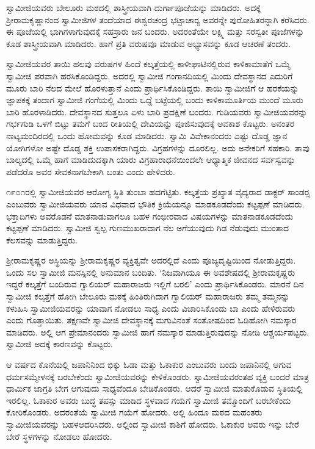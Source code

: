  ಸ್ವಾಮೀಜಿಯವರು ಬೇಲೂರು ಮಠದಲ್ಲಿ ಶಾಸ್ತ್ರೀಯವಾಗಿ ದುರ್ಗಾಪೂಜೆಯನ್ನು ಮಾಡಿದರು. ಅದಕ್ಕೆ ಶ‍್ರೀರಾಮಕೃಷ್ಣಾನಂದ ಸ್ವಾಮೀಜಿಗಳ ತಂದೆಯಾದ ಈಶ್ವರಚಂದ್ರ ಭಟ್ಟಾಚಾರ‍್ಯ ಅವರನ್ನೇ ಪುರೋಹಿತರನ್ನಾಗಿ ಕರೆಸಿದರು. ಈ ಪೂಜೆಯಲ್ಲಿ ಭಾಗಿಗಳಾಗುವುದಕ್ಕೆ ಸಹಸ್ರಾರು ಜನ ಬಂದರು. ಅದರಂತೆಯೇ ಲಕ್ಷ್ಮಿ ಮತ್ತು ಸರಸ್ವತೀ ಪೂಜೆಗಳನ್ನು ಕೂಡ ಶಾಸ್ತ್ರೀಯವಾಗಿ ಮಾಡಿದರು. ಹಾಗೆ ಪ್ರತಿ ವರುಷವೂ ಮಾಡುವ ಅಭ್ಯಾಸವನ್ನು ಕೂಡ ಆಚರಣೆ ತಂದರು. 

 ಸ್ವಾಮೀಜಿಯವರ ತಾಯಿ ಹಲವು ವರುಷಗಳ ಹಿಂದೆ ಕಲ್ಕತ್ತೆಯಲ್ಲಿ ಕಾಳೀಘಾಟಿನಲ್ಲಿರುವ ಕಾಳಿಕಾಮಾತೆಗೆ ಒಮ್ಮೆ ಸ್ವಾಮೀಜಿ ಪರವಾಗಿ ಹರಸಿಕೊಂಡಿದ್ದರು. ಅದರಲ್ಲಿ ಸ್ವಾಮೀಜಿ ಗಂಗಾನದಿಯಲ್ಲಿ ಮಿಂದು ದೇವಸ್ಥಾನದ ಎದುರಿಗೆ ಮೂರು ಬಾರಿ ನೆಲದ ಮೇಲೆ ಹೊರಳುತ್ತಾನೆ ಎಂದು ಪ್ರಾರ್ಥಿಸಿಕೊಂಡಿದ್ದರು. ತಾಯಿ ಸ್ವಾಮೀಜಿಗೆ ಆ ಹರಕೆಯನ್ನು ಜ್ಞಾಪಕಕ್ಕೆ ತಂದಾಗ ಸ್ವಾಮೀಜಿ ಗಂಗೆಯಲ್ಲಿ ಮಿಂದು ಒದ್ದೆ ಬಟ್ಟೆಯಲ್ಲಿ ಬಂದು ಕಾಳಿಕಾಮೂರ್ತಿಯ ಮುಂದೆ ಮೂರು ಬಾರಿ ಹೊರಳಾಡಿದರು. ದೇವಸ್ಥಾನದ ಸುತ್ತಲೂ ಏಳು ಬಾರಿ ಪ್ರದಕ್ಷಿಣೆ ಬಂದರು. ಗುಡಿಯವರು ಸ್ವಾಮೀಜಿಯವರನ್ನು ಗರ್ಭಗುಡಿ ಒಳಗೆ ಬಿಟ್ಟು ತಮಗೆ ಬಂದ ರೀತಿಯಲ್ಲಿ ದೇವಿಯನ್ನು ಪೂಜಿಸುವುದಕ್ಕೆ ಅವಕಾಶ ಕೊಟ್ಟರು. ಅನಂತರ ನಾಟ್ಯಮಂದಿರದಲ್ಲಿ ಒಂದು ಹೋಮವನ್ನು ಕೂಡ ಮಾಡಿದರು. ಸ್ವಾಮಿ ವಿವೇಕಾನಂದರು ಎಷ್ಟು ದೊಡ್ಡ ಜ್ಞಾನ ಯೋಗಿಗಳೋ ಅಷ್ಟೇ ದೊಡ್ಡ ಶಕ್ತಿ ಉಪಾಸಕರಾಗಿದ್ದರು. ವಿಗ್ರಹಗಳನ್ನು ದೂರಲಿಲ್ಲ. ಅದು ಅನೇಕರಿಗೆ ಸಹಕಾರಿ. ತಾವು ಬಾಲ್ಯದಲ್ಲಿ ಒಮ್ಮೆ ಹಾಗೆ ಮಾಡಿದುದಕ್ಕಾಗಿ ಯಾರು ವಿಗ್ರಹಾರಾಧನೆಯಿಂದಲೇ ಆಧ್ಯಾತ್ಮಿಕ ಜೀವನದ ಸರ್ವಸ್ವವನ್ನು ಪಡೆದರೊ ಅವರ ಸೇವಕನಾಗಬೇಕಾಗಿ ಬಂತು ಎಂದು ಹೇಳಿದರು. 

 ೧೯೦೧ರಲ್ಲಿ ಸ್ವಾಮೀಜಿಯವರ ಆರೋಗ್ಯ ಸ್ಥಿತಿ ತುಂಬಾ ಹದಗೆಟ್ಟಿತು. ಕಲ್ಕತ್ತೆಯ ಪ್ರಖ್ಯಾತ ವೈದ್ಯರಾದ ಡಾಕ್ಟರ್ ಸಾಂಡರ‍್ಸ ಎಂಬುವರು ಸ್ವಾಮೀಜಿಯವರು ಯಾವ ವಿಧವಾದ ಭೌತಿಕ ಕ್ರಿಯೆಯನ್ನೂ ಮಾಡಕೂಡದೆಂದು ಕಟ್ಟಪ್ಪಣೆ ಮಾಡಿದರು. ಭಕ್ತಾದಿಗಳು ಅವರೊಡನೆ ಮಾತನಾಡುವಾಗಲೂ ಬಹಳ ಗಂಭೀರವಾದ ವಿಷಯಗಳನ್ನು ಮಾತನಾಡಕೂಡದೆಂದು ಕಟ್ಟಪ್ಪಣೆ ಮಾಡಿದರು. ಸ್ವಾಮೀಜಿ ಸ್ವಲ್ಪ ಗುಣಮುಖರಾದಾಗ ನೆಲ ಅಗೆಯುವುದು ಗಿಡ ನೆಡುವುದು ಮುಂತಾದ ಕೆಲಸವನ್ನು ಮಾಡುತ್ತಿದ್ದರು. 

 ಶ‍್ರೀರಾಮಕೃಷ್ಣರ ಅಸ್ಥಿಯನ್ನು ಶ‍್ರೀರಾಮಕೃಷ್ಣರ ವ್ಯಕ್ತಿತ್ವವೇ ಅದರಲ್ಲಿದೆ ಎಂದು ಪೂಜ್ಯದೃಷ್ಟಿಯಿಂದ ನೋಡುತ್ತಿದ್ದರು. ಒಂದು ಸಲ ಸ್ವಾಮೀಜಿ ಮನಸ್ಸಿನಲ್ಲಿ ಅನುಮಾನ ಬಂದಿತು. ‘ನಿಜವಾಗಿಯೂ ಈ ಅವಶೇಷದಲ್ಲಿ ಶ‍್ರೀರಾಮಕೃಷ್ಣರು ಇದ್ದರೆ ಕಲ್ಕತ್ತೆಗೆ ಬಂದಿರುವ ಗ್ವಾಲಿಯರ್ ಮಹಾರಾಜರು ಇಲ್ಲಿಗೆ ಬರಲಿ’ ಎಂದು ಪ್ರಾರ್ಥಿಸಿಕೊಂಡರು. ಮಾರನೆ ದಿನ ಸ್ವಾಮೀಜಿ ಕಲ್ಕತ್ತೆಗೆ ಹೋಗಿ ಬೇಲೂರು ಮಠಕ್ಕೆ ಹಿಂತಿರುಗಿದಾಗ ಗ್ವಾಲಿಯರ್ ಮಹಾರಾಜರು ತಮ್ಮ ತಮ್ಮನನ್ನು ಕಳುಹಿಸಿ ಸ್ವಾಮೀಜಿಯವರನ್ನು ಯಾವಾಗ ನೋಡಲು ಸಾಧ್ಯ ಎಂದು ವಿಚಾರಿಸಿಕೊಂಡು ಬಾ ಎಂದು ಹೇಳಿರುವರು ಎಂದು ಗೊತ್ತಾಯಿತು. ತಕ್ಷಣವೇ ಸ್ವಾಮೀಜಿ ದೇವಸ್ಥಾನಕ್ಕೆ ಮಗುವಿನಂತೆ ಸಂತೋಷದಿಂದ ಓಡಿಹೋಗಿ ನಮಸ್ಕಾರ ಮಾಡಿದರು. ಅಲ್ಲಿ ಆಗ ಪ್ರೇಮಾನಂದರು ಸ್ವಾಮೀಜಿ ಹಾಗೆ ನಮಸ್ಕಾರ ಮಾಡುತ್ತಿರುವುದನ್ನು ನೋಡಿ ಆಶ್ಚರ್ಯಪಟ್ಟರು. ಸ್ವಾಮೀಜಿ ಅದಕ್ಕೆ ಕಾರಣವನ್ನು ಕೊಟ್ಟರು. 

 ಆ ವರ್ಷದ ಕೊನೆಯಲ್ಲಿ ಜಪಾನಿನಿಂದ ಭಿಕ್ಕು ಓಡಾ ಮತ್ತು ಓಕಾಕುರ ಎಂಬುವರು ಬಂದು ಜಪಾನಿನಲ್ಲಿ ಆಗುವ ಧರ್ಮಸಮ್ಮೇಳನಕ್ಕೆ ಬರಬೇಕೆಂದು ಸ್ವಾಮೀಜಿಯವರನ್ನು ಕೇಳಿಕೊಂಡರು. ಸ್ವಾಮೀಜಿಯವರಂತಹ ವ್ಯಕ್ತಿ ಬಂದರೆ ಮಾತ್ರ ಧಾರ್ಮಿಕ ಜಾಗ್ರತಿ ಬೇಗ ಆಗುವುದು ಸಾಧ್ಯವೆಂದೂ ಬೇಡಿಕೊಂಡರು. ಆದರೆ ಸ್ವಾಮೀಜಿ ಮಾತುಕೊಡುವ ಸ್ಥಿತಿಯಲ್ಲಿ ಇರಲಿಲ್ಲ. ಓಕಾಕುರ ಅವರು ಬುದ್ಧ ತಪಸ್ಸು ಮಾಡಿದ ಸ್ಥಳವಾದ ಗಯೆಗೆ ಸ್ವಾಮೀಜಿ ತಮ್ಮೊಂದಿಗೆ ಬರಬೇಕೆಂದು ಕೋರಿಕೊಂಡರು. ಅದರಂತೆಯೆ ಸ್ವಾಮೀಜಿ ಗಯೆಗೆ ಹೋದರು. ಅಲ್ಲಿ ಹಿಂದೂ ಮಠದ ಮಹಂತರು ಸ್ವಾಮೀಜಿಯವರನ್ನು ಬಹಳ\break ಆದರಿಸಿದರು. ಅಲ್ಲಿಂದ ಸ್ವಾಮೀಜಿ ಕಾಶಿಗೆ ಹೋದರು. ಓಕಾಕುರ ಅವರು ಇನ್ನು ಬೇರೆ ಬೇರೆ ಸ್ಥಳಗಳನ್ನು ನೋಡಲು ಹೋದರು. 

